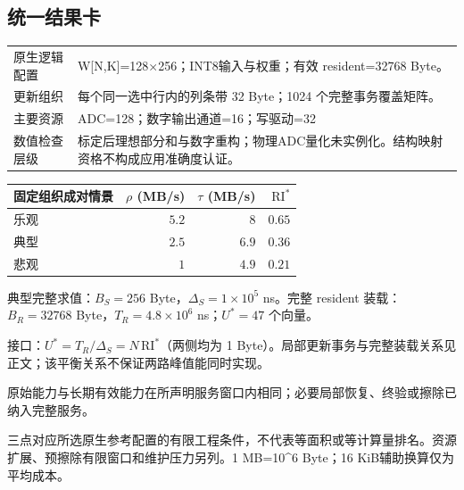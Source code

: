\subsection*{统一结果卡}
\begingroup\small
\noindent\begin{tabularx}{\textwidth}{@{}p{24mm}X@{}}\toprule
原生逻辑配置 & W[N,K]=128×256；INT8输入与权重；有效 resident=32768 Byte。\\
更新组织 & 每个同一选中行内的列条带 32 Byte；1024 个完整事务覆盖矩阵。\\
主要资源 & ADC=128；数字输出通道=16；写驱动=32\\
数值检查层级 & 标定后理想部分和与数字重构；物理ADC量化未实例化。结构映射资格不构成应用准确度认证。\\
\bottomrule\end{tabularx}
\vspace{3mm}
\begin{center}\begin{tabular}{@{}lrrr@{}}\toprule
固定组织成对情景 & $\rho$ (MB/s) & $\tau$ (MB/s) & $\mathrm{RI}^{*}$\\\midrule
乐观 & $5.2$ & $8$ & $0.65$\\
典型 & $2.5$ & $6.9$ & $0.36$\\
悲观 & $1$ & $4.9$ & $0.21$\\
\bottomrule\end{tabular}\end{center}
\noindent 典型完整求值：$B_S=256$ Byte，$\Delta_S=1\times10^{5}$ ns。完整 resident 装载：$B_R=32768$ Byte，$T_R=4.8\times10^{6}$ ns；$U^*=47$ 个向量。
\par\smallskip\noindent 接口：$U^*=T_R/\Delta_S=N\,\mathrm{RI}^*$（两侧均为 1 Byte）。局部更新事务与完整装载关系见正文；该平衡关系不保证两路峰值能同时实现。
\par\smallskip\noindent 原始能力与长期有效能力在所声明服务窗口内相同；必要局部恢复、终验或擦除已纳入完整服务。
\par\smallskip\noindent 三点对应所选原生参考配置的有限工程条件，不代表等面积或等计算量排名。资源扩展、预擦除有限窗口和维护压力另列。1 MB=10\textasciicircum{}6 Byte；16 KiB辅助换算仅为平均成本。
\endgroup
\clearpage
